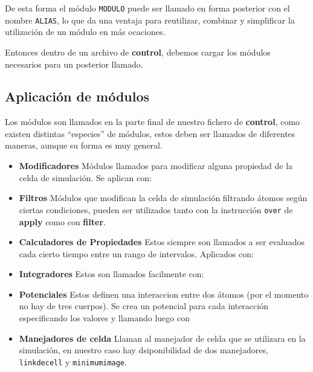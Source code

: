 De esta forma el m\'odulo \texttt{MODULO} puede ser llamado en forma posterior con el nombre \texttt{ALIAS}, lo que da una ventaja para reutilizar, combinar y simplificar la utilizaci\'on de un m\'odulo en m\'as ocaciones.

Entonces dentro de un archivo de \textbf{control}, debemos cargar los m\'odulos necesarios para un posterior llamado.

\subsection{Aplicaci\'on de m\'odulos}

Los m\'odulos son llamados en la parte final de nuestro fichero de \textbf{control}, como existen distintas ``especies'' de m\'odulos, estos deben ser llamados de diferentes maneras, aunque su forma es muy general.

\begin{itemize}
 \item \textbf{Modificadores}
  M\'odulos llamados para modificar alguna propiedad de la celda de simulaci\'on. Se aplican con:
 \item \textbf{Filtros}
  M\'odulos que modifican la celda de simulaci\'on filtrando \'atomos seg\'un ciertas condiciones, pueden ser
  utilizados tanto con la instrucci\'on \verb|over| de \textbf{apply} como con \textbf{filter}.
 \item \textbf{Calculadores de Propiedades}
  Estos siempre son llamados a ser evaluados cada cierto tiempo entre un rango de intervalos. Aplicados con:
 \item \textbf{Integradores}
  Estos son llamados facilmente con:
 \item \textbf{Potenciales}
  Estos definen una interaccion entre dos \'atomos (por el momento no hay de tres cuerpos). Se crea un potencial para cada interacci\'on especificando los valores y llamando luego con
 \item \textbf{Manejadores de celda}
  Llaman al manejador de celda que se utilizara en la simulaci\'on, en nuestro caso hay dsiponibilidad de dos manejadores, \verb|linkdecell| y \verb|minimumimage|.
\end{itemize}

